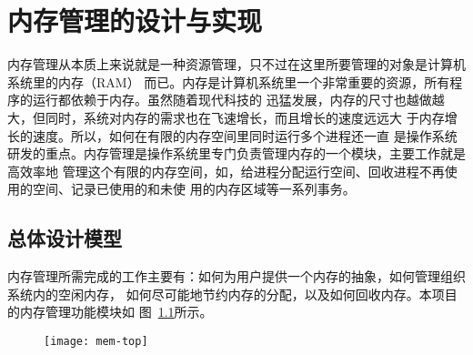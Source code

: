\documentclass{swfuthesism}
\begin{document}
\chapter{内存管理的设计与实现}

内存管理从本质上来说就是一种资源管理，只不过在这里所要管理的对象是计算机系统里的内存（RAM）
而已。内存是计算机系统里一个非常重要的资源，所有程序的运行都依赖于内存。虽然随着现代科技的
迅猛发展，内存的尺寸也越做越大，但同时，系统对内存的需求也在飞速增长，而且增长的速度远远大
于内存增长的速度\cite{drepper2007every}。所以，如何在有限的内存空间里同时运行多个进程还一直
是操作系统研发的重点。内存管理是操作系统里专门负责管理内存的一个模块，主要工作就是高效率地
管理这个有限的内存空间，如，给进程分配运行空间、回收进程不再使用的空间、记录已使用的和未使
用的内存区域等一系列事务。

\section{总体设计模型}

内存管理所需完成的工作主要有：如何为用户提供一个内存的抽象，如何管理组织系统内的空闲内存，
如何尽可能地节约内存的分配，以及如何回收内存。本项目的内存管理功能模块如
图~\ref{fig:mem-top}所示。

\begin{figure}[t]
  \centering
  \begin{center}
    \texttt{[image: mem-top]}
  \end{center}
  \label{fig:mem-top}
\end{figure}


\end{document}
